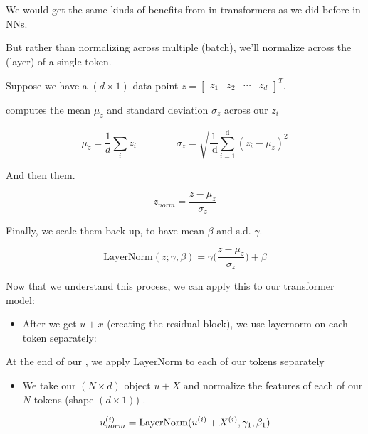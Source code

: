 
        We would get the same kinds of benefits from  in transformers as we did before in NNs. 

        But rather than normalizing across multiple  (batch), we'll normalize across the  (layer) of a single token.\\

        \begin{kequation}
            Suppose we have a $(d \times 1)$ data point $z = \begin{bmatrix}
                z_1 & z_2 & \cdots & z_d
            \end{bmatrix}^T$. 
            
             computes the mean $\mu_z$ and standard deviation $\sigma_z$ across our  $z_i$

            $$\mu_z = \frac{1}{d} \sum_i z_i \qquad \qquad \sigma_z=\sqrt{\frac{1}{\mathrm{~d}} \sum_{i=1}^{\mathrm{d}}\left(z_i-\mu_z\right)^2} $$

            And then  them.

            $$z_{norm} = \frac{z - \mu_z}{\sigma_z}$$

            Finally, we scale them back up, to have mean $\beta$ and s.d. $\gamma$.

            $$\text{LayerNorm}(z; \gamma, \beta) = \gamma \Big( \frac{z - \mu_z}{\sigma_z} \Big) + \beta $$
        \end{kequation}


        Now that we understand this process, we can apply this to our transformer model:

        \begin{itemize}
            \item After we get $u+x$ (creating the residual block), we use layernorm on each token separately:\\
        \end{itemize}

        \begin{concept}
            At the end of our , we apply LayerNorm to each of our tokens separately

            \begin{itemize}
                \item We take our $(N \times d)$ object $u+X$ and normalize the features of each of our $N$ tokens (shape $(d \times 1)$) .
            \end{itemize}

            $$u_{norm}^{(i)} = \text{LayerNorm}(u^{(i)}+ X^{(i)}, \gamma_1, \beta_1)$$
        \end{concept}

